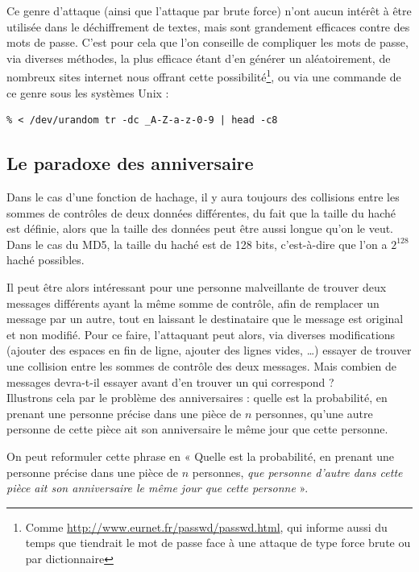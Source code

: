 Ce genre d'attaque (ainsi que l'attaque par brute force) n'ont
aucun intérêt à être utilisée dans le déchiffrement de textes,
mais sont grandement efficaces contre des mots de passe. C'est
pour cela que l'on conseille de compliquer les mots de passe, via
diverses méthodes, la plus efficace étant d'en générer un
aléatoirement, de nombreux sites internet nous offrant cette
possibilité\footnote{Comme
\url{http://www.eurnet.fr/passwd/passwd.html}, qui informe aussi
du temps que tiendrait le mot de passe face à une attaque de type
force brute ou par dictionnaire}, ou via une commande de ce genre sous les systèmes
Unix :
\lstset{language=bash}
\begin{lstlisting}
% < /dev/urandom tr -dc _A-Z-a-z-0-9 | head -c8 
\end{lstlisting}

\subsection{Le paradoxe des anniversaire}
Dans le cas d'une fonction de hachage, il y aura toujours des
collisions entre les sommes de contrôles de deux données
différentes, du fait que la taille du haché est définie, alors que
la taille des données peut être aussi longue qu'on le veut.
Dans le cas du MD5, la taille du haché est de 128 bits,
c'est-à-dire que l'on a $2^{128}$ haché possibles.

Il peut être alors intéressant pour une personne malveillante de
trouver deux messages différents ayant la même somme de contrôle,
afin de remplacer un message par un autre, tout en laissant le
destinataire que le message est original et non modifié. Pour ce
faire, l'attaquant peut alors, via diverses modifications (ajouter
des espaces en fin de ligne, ajouter des lignes vides, …) essayer
de trouver une collision entre les sommes de contrôle des deux
messages. Mais combien de messages devra-t-il essayer avant d'en
trouver un qui correspond ?
\\

Illustrons cela par le problème des anniversaires : quelle est la
probabilité, en prenant une personne précise dans une pièce de $n$
personnes, qu'une autre personne de cette pièce ait son
anniversaire le même jour que cette personne.

On peut reformuler cette phrase en « Quelle est la probabilité, en
prenant une personne précise dans une pièce de $n$ personnes,
\emph{que personne d'autre dans cette pièce ait son anniversaire
le même jour que cette personne} ».

